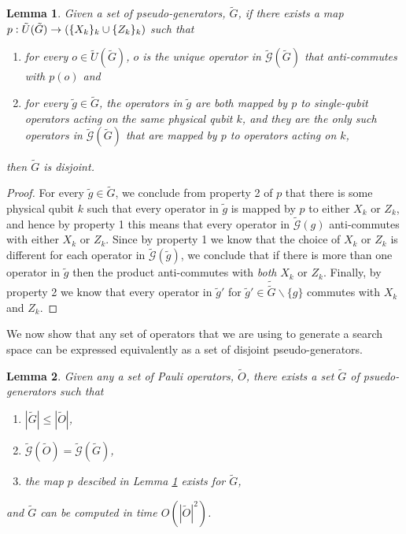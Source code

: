 \documentclass[twocolumn,showpacs,preprintnumbers,amsmath,amssymb,nofootinbib,pra,floatfix]{revtex4-1}
\newtheorem{lemma}{Lemma}
\newenvironment{remark}[1][Remark]{\begin{trivlist}
\item[\hskip \labelsep {\bfseries #1}]}{\end{trivlist}}
\newcommand{\set}{\tilde}
\newcommand{\genfun}{\tilde{\mathcal{G}}}
\begin{document}
\begin{lemma}
\label{lemma:disjointness-equvalence}
Given a set of pseudo-generators, $\set G$, if there exists a map $p:\set U(\set G)\to \paren{\{X_k\}_k \cup \{Z_k\}_k}$ such that
\begin{enumerate}
\item for every $o\in\set U(\set G)$, $o$ is the unique operator in $\genfun(\set G)$ that anti-commutes with $p(o)$ and
\item for every $\set g\in\set G$, the operators in $\set g$ are both mapped by $p$ to single-qubit operators acting on the same physical qubit $k$, and they are the only such operators in $\genfun(\set G)$ that are mapped by $p$ to operators acting on $k$,
\end{enumerate}
then $\set G$ is disjoint.
\end{lemma}

\begin{proof}
For every $\set g\in\set G$, we conclude from property 2 of $p$ that there is some physical qubit $k$ such that every operator in $\set g$ is mapped by $p$ to either $X_k$ or $Z_k$, and hence by property 1 this means that every operator in $\genfun(g)$ anti-commutes with either $X_k$ or $Z_k$.  Since by property 1 we know that the choice of $X_k$ or $Z_k$ is different for each operator in $\genfun(\set g)$, we conclude that if there is more than one operator in $\set g$ then the product anti-commutes with \emph{both} $X_k$ or $Z_k$.  Finally, by property 2 we know that every operator in $\set g'$ for $\set g'\in\set \set G\backslash\{g\}$ commutes with $X_k$ and $Z_k$.
\end{proof}

\begin{remark}
We now show that any set of operators that we are using to generate a search space can be expressed equivalently as a set of disjoint pseudo-generators.
\end{remark}

\begin{lemma}
\label{lemma:computing-disjoint-pseudo-generators}
Given any a set of Pauli operators, $\set O$, there exists a set $\set G$ of psuedo-generators such that
\begin{enumerate}
\item $|\set G|\le|\set O|$,
\item $\genfun(\set O)=\genfun(\set G)$,
\item the map $p$ descibed in Lemma \ref{lemma:disjointness-equvalence} exists for $\set G$,
\end{enumerate}
and $\set G$ can be computed in time $O(|\set O|^2)$.
\end{lemma}
\end{document}
